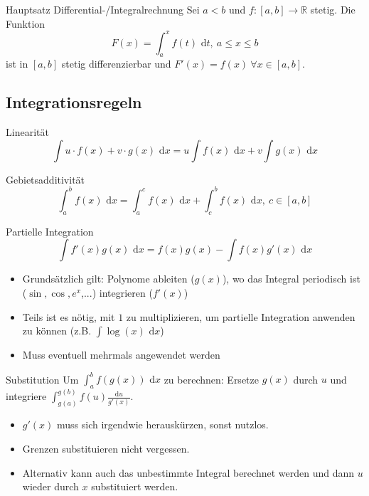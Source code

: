 \documentclass[a4paper,10pt]{article}
\def\R{\mathbb{R}}
\def\dx{\text{ d}x}
\begin{document}
\begin{mainbox}{Hauptsatz Differential-/Integralrechnung}
 Sei $a<b$ und $f: [a,b] \to \R$ stetig. Die Funktion 
 $$F(x) = \int_a^x f(t) \text{ d}t, \ a \le x \le b$$
 ist in $[a,b]$ stetig differenzierbar und $F'(x) = f(x) \ \forall x \in [a,b]$.
\end{mainbox}

\subsection{Integrationsregeln}
\begin{subbox}{Linearität}
 \vspace{-12pt}
 $$\int u\cdot f(x) + v \cdot g(x) \dx = u \int f(x) \dx + v \int g(x) \dx$$
\end{subbox}
\begin{subbox}{Gebietsadditivität}
 \vspace{-12pt}
 $$\int_a^b f(x) \dx = \int_a^c f(x) \dx + \int_c^b f(x) \dx, \ c \in [a,b]$$
\end{subbox}
\begin{mainbox}{Partielle Integration}
 \vspace{-12pt}
 $$\int f'(x) g(x) \dx = f(x)g(x) - \int f(x) g'(x) \dx$$
\end{mainbox}
\begin{itemize}
 \item Grundsätzlich gilt: Polynome ableiten ($g(x)$), wo das Integral periodisch ist ($\sin, \cos, e^x$,...) integrieren ($f'(x)$)
 \item Teils ist es nötig, mit $1$ zu multiplizieren, um partielle Integration anwenden zu können (z.B. $\int \log(x) \dx$)
 \item Muss eventuell mehrmals angewendet werden
\end{itemize}
\begin{mainbox}{Substitution}
 Um $\int_a^b f(g(x)) \dx$ zu berechnen: Ersetze $g(x)$ durch $u$ und integriere $\int_{g(a)}^{g(b)} f(u) \frac{\text{d}u}{g'(x)}$.
\end{mainbox}
\begin{itemize}
 \item $g'(x)$ muss sich irgendwie herauskürzen, sonst nutzlos.
 \item Grenzen substituieren nicht vergessen.
 \item Alternativ kann auch das unbestimmte Integral berechnet werden und dann $u$ wieder durch $x$ substituiert werden.
\end{itemize}
\end{document}
